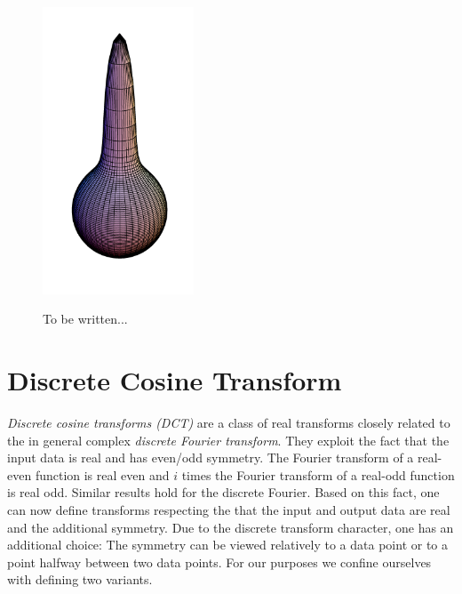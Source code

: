 \begin{figure}[tb]
     {\includegraphics[width=0.4\textwidth]{images/p_085.png}}
  \caption{To be written...}
\end{figure}

\label{Basics:SphericalKernels}

\section{Discrete Cosine Transform}
\label{Basics:DiscreteCosineTransform}

\emph{Discrete cosine transforms (DCT)} are a class of real transforms closely related to the 
in general complex \emph{discrete Fourier transform}. They exploit the fact that the 
input data is real and has even/odd symmetry. The Fourier transform of a real-even 
function is real even and $i$ times the Fourier transform of a real-odd function is real 
odd. Similar results hold for the discrete Fourier. Based on this fact, one can now define 
transforms respecting the that the input and output data are real and the additional symmetry.
Due to the discrete transform character, one has an additional choice: The symmetry can be 
viewed relatively to a data point or to a point halfway between two data points. For our 
purposes we confine ourselves with defining two variants.

